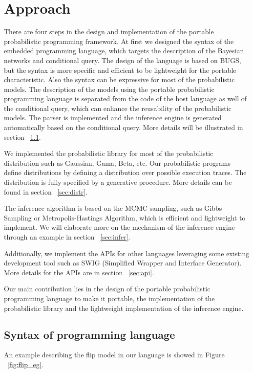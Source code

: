 \chapter{Approach}
\label{chap:approach}
There are four steps in the design and implementation of the portable probabilistic programming framework. At first we designed the syntax of the embedded programming language, which targets the description of the Bayesian networks and conditional query.  The design of the language is based on BUGS, but the syntax is more specific and efficient to be lightweight for the portable characteristic. Also the syntax can be expressive for most of the probabilistic models. The description of the models using the portable probabilistic programming language is separated from the code of the host language as well of the conditional query, which can enhance the reusability of the probabilistic models. The parser is implemented and the inference engine is generated automatically based on the conditional query. More details will be illustrated in section ~\ref{sec:syntax}. 

We implemented the probabilistic library for most of the probabilistic distribution such as Gaussian, Gama, Beta, etc. Our probabilistic programs define distributions by defining a distribution over possible execution traces. The distribution is fully specified by a generative procedure. More details can be found in section ~\ref{sec:distr}. 

The inference algorithm is based on the MCMC sampling, such as Gibbs Sampling or Metropolis-Hastings Algorithm, which is efficient and lightweight to implement. We will elaborate more on the mechanism of the inference engine through an example in section ~\ref{sec:infer}. 

Additionally, we implement the APIs for other languages leveraging some existing development tool such as SWIG (Simplified Wrapper and Interface Generator). More details for the APIs are in section ~\ref{sec:api}.

Our main contribution lies in the design of the portable probabilistic programming language to make it portable, the implementation of the probabilistic library and the lightweight implementation of the inference engine.


\section{Syntax of programming language}
\label{sec:syntax}

An example describing the flip model in our language is showed in Figure ~\ref{fig:flip_eg}. 

